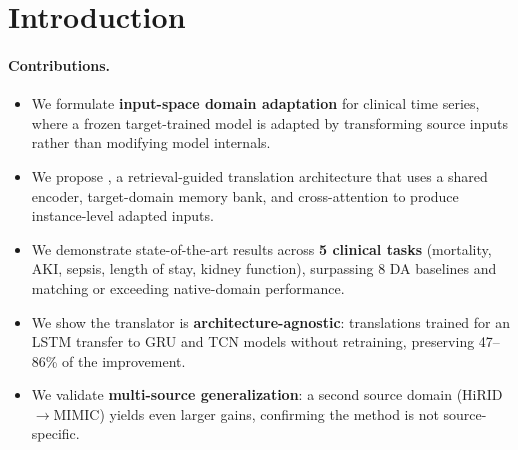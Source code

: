 \section{Introduction}
\label{sec:introduction}






\paragraph{Contributions.}
\begin{itemize}
    \item We formulate \textbf{input-space domain adaptation} for clinical time series, where a frozen target-trained model is adapted by transforming source inputs rather than modifying model internals.
    \item We propose \retr{}, a retrieval-guided translation architecture that uses a shared encoder, target-domain memory bank, and cross-attention to produce instance-level adapted inputs.
    \item We demonstrate state-of-the-art results across \textbf{5 clinical tasks} (mortality, AKI, sepsis, length of stay, kidney function), surpassing 8 DA baselines and matching or exceeding native-domain performance.
    \item We show the translator is \textbf{architecture-agnostic}: translations trained for an LSTM transfer to GRU and TCN models without retraining, preserving 47--86\% of the improvement.
    \item We validate \textbf{multi-source generalization}: a second source domain (HiRID$\to$MIMIC) yields even larger gains, confirming the method is not source-specific.
\end{itemize}
